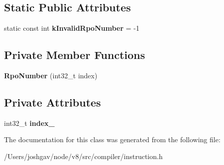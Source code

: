 \subsection*{Static Public Attributes}
\begin{DoxyCompactItemize}
\item 
static const int {\bfseries k\+Invalid\+Rpo\+Number} = -\/1\hypertarget{classv8_1_1internal_1_1compiler_1_1_rpo_number_a836c3179486977b939b9f157a9a9ca64}{}\label{classv8_1_1internal_1_1compiler_1_1_rpo_number_a836c3179486977b939b9f157a9a9ca64}

\end{DoxyCompactItemize}
\subsection*{Private Member Functions}
\begin{DoxyCompactItemize}
\item 
{\bfseries Rpo\+Number} (int32\+\_\+t index)\hypertarget{classv8_1_1internal_1_1compiler_1_1_rpo_number_a452fee3f6e61038d6ad2358fe3132238}{}\label{classv8_1_1internal_1_1compiler_1_1_rpo_number_a452fee3f6e61038d6ad2358fe3132238}

\end{DoxyCompactItemize}
\subsection*{Private Attributes}
\begin{DoxyCompactItemize}
\item 
int32\+\_\+t {\bfseries index\+\_\+}\hypertarget{classv8_1_1internal_1_1compiler_1_1_rpo_number_abefbf042ff8c6e60cd3724973ff8d4d3}{}\label{classv8_1_1internal_1_1compiler_1_1_rpo_number_abefbf042ff8c6e60cd3724973ff8d4d3}

\end{DoxyCompactItemize}


The documentation for this class was generated from the following file\+:\begin{DoxyCompactItemize}
\item 
/\+Users/joshgav/node/v8/src/compiler/instruction.\+h\end{DoxyCompactItemize}
